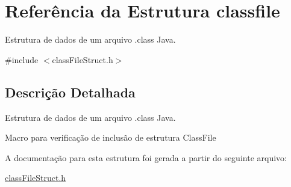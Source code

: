 \hypertarget{structclassfile}{}\section{Referência da Estrutura classfile}
\label{structclassfile}


Estrutura de dados de um arquivo .class Java.  




{\ttfamily \#include $<$class\+File\+Struct.\+h$>$}



\subsection{Descrição Detalhada}
Estrutura de dados de um arquivo .class Java. 

Macro para verificação de inclusão de estrutura Class\+File 

A documentação para esta estrutura foi gerada a partir do seguinte arquivo\+:\begin{DoxyCompactItemize}
\item 
\hyperlink{classFileStruct_8h}{class\+File\+Struct.\+h}\end{DoxyCompactItemize}
